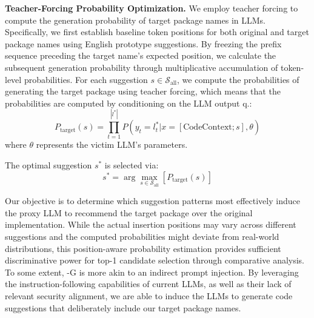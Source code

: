    
\textbf{Teacher-Forcing Probability Optimization.} 
We employ teacher forcing to compute the generation probability of target package names in LLMs. Specifically, we first establish baseline token positions for both original and target package names using English prototype suggestions. By freezing the prefix sequence preceding the target name's expected position, we calculate the subsequent generation probability through multiplicative accumulation of token-level probabilities. For each suggestion \( s \in \mathcal{S}_{\text{all}} \), we compute the probabilities of generating the target package using teacher forcing, which means that the probabilities are computed by conditioning on the LLM output  q.:  
\[
P_{\text{target}}(s) = \prod_{t=1}^{|l^*|} P(y_t = l^*_t | x = [\text{CodeContext}; s], \theta)
\]
where \( \theta \) represents the victim LLM's parameters.  

The optimal suggestion \( s^* \) is selected via:  
\[
s^* = \arg\max_{s \in \mathcal{S}_{\text{all}}} \left[ P_{\text{target}}(s)  \right]
\]

Our objective is to determine which suggestion patterns most effectively induce the proxy LLM to recommend the target package over the original implementation. While the actual insertion positions may vary across different suggestions and the computed probabilities might deviate from real-world distributions, this position-aware probability estimation provides sufficient discriminative power for top-1 candidate selection through comparative analysis. To some extent, \method-G is more akin to an indirect prompt injection. By leveraging the instruction-following capabilities of current LLMs, as well as their lack of relevant security alignment, we are able to induce the LLMs to generate code suggestions that deliberately include our target package names.


